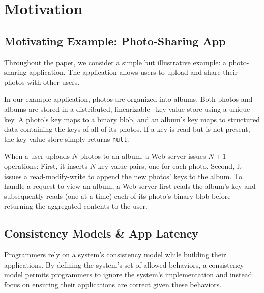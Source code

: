 \section{Motivation}

\subsection{Motivating Example: Photo-Sharing App}

Throughout the paper, we consider a simple but illustrative
example: a photo-sharing application. The application allows
users to upload and share their photos with other users.

In our example application, photos are organized into
albums. Both photos and albums are stored in a distributed,
linearizable~\cite{herlihy1990linearizability} key-value store
using a unique key. A photo’s key maps to a binary blob, and
an album’s key maps to structured data containing the keys of
all of its photos. If a key is read but is not present, the
key-value store simply returns \texttt{null}.

When a user uploads $N$ photos to an album, a Web server
issues $N+1$ operations: First, it inserts $N$ key-value
pairs, one for each photo. Second, it issues a read-modify-write
to append the new photos' keys to the album. To handle a request to
view an album, a Web server first reads the album's key and subsequently
reads (one at a time) each of its photo's binary blob before
returning the aggregated contents to the user.



\subsection{Consistency Models \& App Latency}

Programmers rely on a system’s consistency model while building their applications. By defining the system’s set of allowed behaviors, a consistency model permits programmers to ignore the system’s implementation and instead focus on ensuring their applications are correct given these behaviors.


